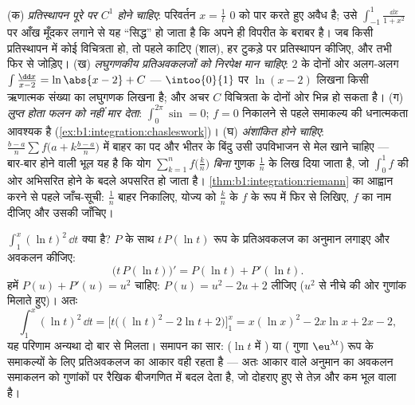 \begin{remark}[समाकल कलन की सामान्य भूलें]
(क) \emph{प्रतिस्थापन पूरे  पर $C^1$ होने चाहिए}: परिवर्तन $x =
\frac1t$ $0$ को पार करते हुए अवैध है; उसे $\int_{-1}^{1}\frac{\dd x}{1 +
x^2}$ पर आँख मूँदकर लगाने से यह ``सिद्ध'' हो जाता है कि  अपने ही विपरीत
के बराबर है। जब किसी प्रतिस्थापन में कोई विचित्रता हो, तो पहले  काटिए
(शाल), हर टुकड़े पर प्रतिस्थापन कीजिए, और तभी फिर से जोड़िए। (ख)
\emph{लघुगणकीय प्रतिअवकलजों को निरपेक्ष मान चाहिए}: $2$ के दोनों ओर अलग-अलग
$\int \frac{\dd x}{x - 2} = \ln\abs{x - 2} + C$ --- $\intoo{0}{1}$ पर $\ln(x
- 2)$ लिखना किसी ऋणात्मक संख्या का लघुगणक लिखना है; और अचर $C$ विचित्रता के
दोनों ओर भिन्न हो सकता है। (ग) \emph{लुप्त होता  फलन को नहीं मार देता}:
$\int_0^{2\pi}\sin = 0$; $f = 0$ निकालने से पहले समाकल्य की धनात्मकता आवश्यक
है (\cref{ex:b1:integration:chasleswork})। (घ) \emph{ अंशांकित होने
चाहिए}: $\frac{b-a}{n}\sum f\bigl(a + k\frac{b-a}{n}\bigr)$ में बाहर का पद
और भीतर के बिंदु उसी उपविभाजन से मेल खाने चाहिए --- बार-बार होने वाली भूल यह
है कि योग $\sum_{k=1}^{n} f\bigl(\frac kn\bigr)$ \emph{बिना} गुणक $\frac1n$
के लिख दिया जाता है, जो $\int_0^1 f$ की ओर अभिसरित होने के बदले अपसरित हो
जाता है। \cref{thm:b1:integration:riemann} का आह्वान करने से पहले जाँच-सूची:
$\frac1n$ बाहर निकालिए, योज्य को $\frac kn$ के $f$ के रूप में फिर से लिखिए,
$f$ का नाम दीजिए और उसकी  जाँचिए।
\end{remark}

\begin{example}[अनुमान लगाइए, अवकलन कीजिए, समायोजन कीजिए]\label{ex:b1:integration:guessdiff}
$\int_1^x (\ln t)^2\,\dd t$ क्या है? $P$  के साथ $t\,P(\ln t)$ रूप के
प्रतिअवकलज का अनुमान लगाइए और अवकलन कीजिए:
\[
\bigl(t\,P(\ln t)\bigr)' = P(\ln t) + P'(\ln t) .
\]
हमें $P(u) + P'(u) = u^2$ चाहिए: $P(u) = u^2 - 2u + 2$ लीजिए ($u^2$ से नीचे
की ओर गुणांक मिलाते हुए)। अतः
\[
\int_1^x (\ln t)^2\,\dd t
= \bigl[t\bigl((\ln t)^2 - 2\ln t + 2\bigr)\bigr]_1^x
= x(\ln x)^2 - 2x\ln x + 2x - 2 ,
\]
यह परिणाम अन्यथा दो बार  से मिलता। समापन का सार: ($\ln t$ में
) या ( गुणा $\eu^{\lambda t}$) रूप के समाकल्यों के लिए प्रतिअवकलज
का आकार वही रहता है --- अतः आकार वाले अनुमान का अवकलन समाकलन को गुणांकों पर
रैखिक बीजगणित में बदल देता है, जो दोहराए हुए  से तेज़ और कम भूल
वाला है।
\end{example}

